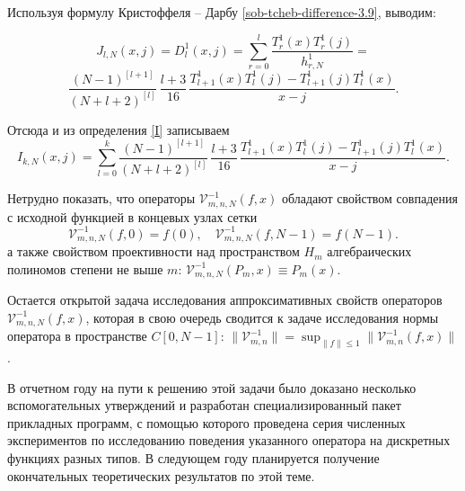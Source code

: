 Используя формулу Кристоффеля -- Дарбу \eqref{sob-tcheb-difference-3.9}, выводим:

\begin{equation*}
  J_{l,N} (x,j) = D^{1}_{l} (x,j) =
  \sum_{r=0}^{l} \frac{T^{1}_{r}(x) T^{1}_{r}(j)}{h^{1}_{r,N}} =
\end{equation*}
\begin{equation}\label{krist}
  \frac{(N-1)^{[l+1]}}{(N+l+2)^{[l]}} \, \frac{l+3}{16}\,
  \frac{T_{l+1}^1(x) T_{l}^1(j) - T_{l+1}^1(j) T_{l}^1(x)}{x-j}.
\end{equation}

Отсюда и из определения \eqref{I} записываем%
\begin{equation*}
  I_{k,N}(x,j) = %
  \sum_{l=0}^{k} \frac{(N-1)^{[l+1]}}{(N+l+2)^{[l]}}\,\frac{l+3}{16}\,
  \frac{T_{l+1}^1(x) T_{l}^1(j) - T_{l+1}^1(j) T_{l}^1(x)}{x-j}.
\end{equation*}



Нетрудно показать, что операторы $\mathcal{V}_{m,n,N}^{-1}(f,x)$ обладают свойством совпадения с исходной функцией в концевых узлах сетки
$$
\mathcal{V}_{m,n,N}^{-1}(f,0)= f(0), \quad \mathcal{V}_{m,n,N}^{-1}(f,N-1)= f(N-1).
$$
а также свойством проективности над пространством $H_{m}$ алгебраических полиномов степени не выше $m$: $\mathcal{V}_{m,n,N}^{-1}(P_m,x)\equiv P_m(x)$.

Остается открытой задача исследования аппроксимативных свойств операторов \linebreak $\mathcal{V}_{m,n,N}^{-1}(f,x)$, которая в свою очередь сводится к задаче исследования нормы оператора в пространстве $C[0, N-1]$:
$\| \mathcal{V}^{-1}_{m,n} \| = \sup_{\| f \| \leq 1} \| \mathcal{V}^{-1}_{m,n}(f,x) \|$.

В отчетном году на пути к решению этой задачи было доказано несколько вспомогательных утверждений и разработан специализированный пакет прикладных программ, с помощью которого проведена серия численных экспериментов по исследованию поведения указанного оператора на дискретных функциях разных типов. В следующем году планируется получение окончательных теоретических результатов по этой теме.



